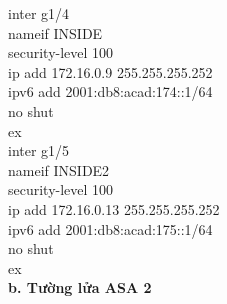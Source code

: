 \documentclass[a4paper, 12pt]{article}
\begin{document}
{\hspace*{2cm}inter g1/4\\
\hspace*{2cm}nameif INSIDE\\
\hspace*{2cm}security-level 100\\
\hspace*{2cm}ip add 172.16.0.9 255.255.255.252\\
\hspace*{2cm}ipv6 add 2001:db8:acad:174::1/64\\
\hspace*{2cm}no shut \\
\hspace*{2cm}ex\\
\hspace*{2cm}inter g1/5\\
\hspace*{2cm}nameif INSIDE2\\
\hspace*{2cm}security-level 100\\
\hspace*{2cm}ip add 172.16.0.13 255.255.255.252\\
\hspace*{2cm}ipv6 add 2001:db8:acad:175::1/64\\
\hspace*{2cm}no shut\\
\hspace*{2cm}ex\\}
\hspace*{1cm}\textbf{b. Tường lửa ASA 2}\\
\end{document}
